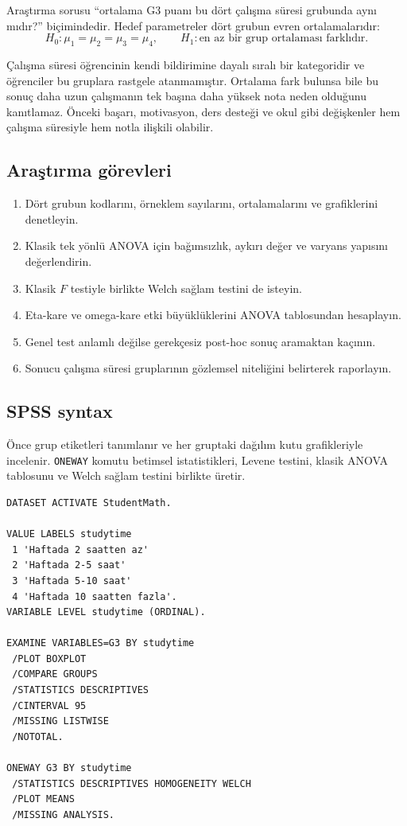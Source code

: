 Araştırma sorusu ``ortalama G3 puanı bu dört çalışma süresi grubunda aynı
mıdır?'' biçimindedir. Hedef parametreler dört grubun evren ortalamalarıdır:
\[
H_0:\mu_1=\mu_2=\mu_3=\mu_4,
\qquad
H_1:\text{en az bir grup ortalaması farklıdır}.
\]

\begin{researchbox}
Çalışma süresi öğrencinin kendi bildirimine dayalı sıralı bir kategoridir ve
öğrenciler bu gruplara rastgele atanmamıştır. Ortalama fark bulunsa bile bu
sonuç daha uzun çalışmanın tek başına daha yüksek nota neden olduğunu
kanıtlamaz. Önceki başarı, motivasyon, ders desteği ve okul gibi değişkenler
hem çalışma süresiyle hem notla ilişkili olabilir.
\end{researchbox}

\subsection{Araştırma görevleri}

\begin{enumerate}
  \item Dört grubun kodlarını, örneklem sayılarını, ortalamalarını ve grafiklerini denetleyin.
  \item Klasik tek yönlü ANOVA için bağımsızlık, aykırı değer ve varyans yapısını değerlendirin.
  \item Klasik $F$ testiyle birlikte Welch sağlam testini de isteyin.
  \item Eta-kare ve omega-kare etki büyüklüklerini ANOVA tablosundan hesaplayın.
  \item Genel test anlamlı değilse gerekçesiz post-hoc sonuç aramaktan kaçının.
  \item Sonucu çalışma süresi gruplarının gözlemsel niteliğini belirterek raporlayın.
\end{enumerate}

\subsection{SPSS syntax}

Önce grup etiketleri tanımlanır ve her gruptaki dağılım kutu grafikleriyle
incelenir. \texttt{ONEWAY} komutu betimsel istatistikleri, Levene testini,
klasik ANOVA tablosunu ve Welch sağlam testini birlikte üretir.

\begin{lstlisting}[language={}]
DATASET ACTIVATE StudentMath.

VALUE LABELS studytime
 1 'Haftada 2 saatten az'
 2 'Haftada 2-5 saat'
 3 'Haftada 5-10 saat'
 4 'Haftada 10 saatten fazla'.
VARIABLE LEVEL studytime (ORDINAL).

EXAMINE VARIABLES=G3 BY studytime
 /PLOT BOXPLOT
 /COMPARE GROUPS
 /STATISTICS DESCRIPTIVES
 /CINTERVAL 95
 /MISSING LISTWISE
 /NOTOTAL.

ONEWAY G3 BY studytime
 /STATISTICS DESCRIPTIVES HOMOGENEITY WELCH
 /PLOT MEANS
 /MISSING ANALYSIS.
\end{lstlisting}

